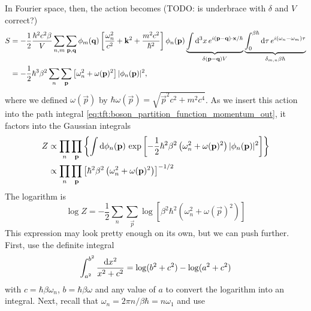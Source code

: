 In Fourier space, then, the action becomes
(TODO: is underbrace with $\delta$ and $V$ correct?)
\begin{equation}
\begin{split}
	S & = -\frac12 \frac{\hbar^2 c^2 \beta}{V}
	      \sum_{n,m} \sum_{\mathbf{p},\mathbf{q}} 
	  	  \phi_m(\mathbf{q}) 
	  	  \left[ \frac{\omega_n^2}{c^2} + \mathbf{k}^2 + \frac{m^2 c^2}{\hbar^2} \right] 
		  \phi_{n}(\mathbf{p})
		  \underbrace{\int \mathop{}\!\mathrm{d}^3 x \, e^{i (\mathbf{p} - \mathbf{q}) \cdot \mathbf{x} / \hbar}}_{\delta(\mathbf{p}-\mathbf{q}) V}
	      \underbrace{\int_0^{\beta \hbar} \mathop{}\!\mathrm{d} \tau \, e^{i (\omega_n - \omega_m) \tau}}_{\delta_{m,n} \beta \hbar}
		  \\
	  & = -\frac12 \hbar^3 \beta^2
	      \sum_n \sum_{\mathbf{p}}
	  	  \left[ \omega_n^2 + \omega(\mathbf{p})^2 \right] 
		  \lvert \phi_{n}(\mathbf{p}) \rvert^2 ,
\end{split}
\end{equation}
where we defined $\omega(\vec{p})$ by $\hbar \omega(\vec{p}) = \sqrt{\vec{p}^2 c^2 + m^2 c^4}$.
As we insert this action into the path integral \eqref{eq:tft:boson_partition_function_momentum_out}, it factors into the Gaussian integrals
\begin{equation}
\begin{split}
	Z & \propto 
	\prod_{n} \prod_{\mathbf{p}}
	\left\{
		\int \mathop{}\!\mathrm{d} \phi_n(\mathbf{p}) \,
		\exp \left[
			-\frac12 \hbar^2 \beta^2 \left(
				\omega_n^2 + \omega(\mathbf{p})^2
			\right)
			\lvert \phi_n(\mathbf{p}) \rvert^2
		\right]
	\right\} \\
	  & \propto
	\prod_{n} \prod_{\mathbf{p}} \left[ 
		\hbar^2 \beta^2 \left( 
			\omega_n^2 + \omega(\mathbf{p})^2
		\right)
	\right]^{-1/2}
\end{split}
\label{eq:tft:boson_gaussian_integral}
\end{equation}
The logarithm is
\begin{equation}
	\log Z = -\frac12 \sum_n \sum_\vec{p} 
	         \log \left[ \beta^2 \hbar^2 \left( \omega_n^2 + \omega(\vec{p})^2 \right) \right]
\end{equation}
This expression may look pretty enough on its own, but we can push further.
First, use the definite integral
\begin{equation}
	\int_{a^2}^{b^2} \frac{\mathop{}\!\mathrm{d} x^2}{x^2 + c^2} = \log(b^2 + c^2) - \log(a^2 + c^2)
\label{eq:tft:integral_trick}
\end{equation}
with $c = \hbar \beta \omega_n$, $b = \hbar \beta \omega$ and any value of $a$ to convert the logarithm into an integral.
Next, recall that $\omega_n = 2 \pi n / \beta \hbar = n \omega_1$ and use
